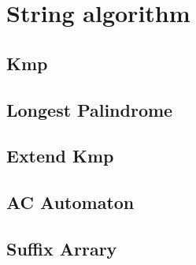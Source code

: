 \section{String algorithm}
	\subsection{Kmp}
		
	\subsection{Longest Palindrome}
		
	\subsection{Extend Kmp}
		
	\subsection{AC Automaton}
		
	\subsection{Suffix Arrary}
		